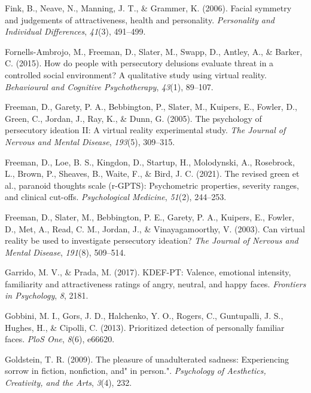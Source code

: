 \documentclass[
  man,floatsintext]{apa6}
\newlength{\cslhangindent}
\newlength{\cslentryspacingunit} %
\newenvironment{CSLReferences}[2] %
 {%
  \setlength{\parindent}{0pt}
  \ifodd #1
  \let\oldpar\par
  \def\par{\hangindent=\cslhangindent\oldpar}
  \fi
  \setlength{\parskip}{#2\cslentryspacingunit}
 }%
 {}
\begin{document}
\begin{CSLReferences}{1}{0}
\leavevmode{}%
Fink, B., Neave, N., Manning, J. T., \& Grammer, K. (2006). Facial symmetry and judgements of attractiveness, health and personality. \emph{Personality and Individual Differences}, \emph{41}(3), 491--499.

\leavevmode{}%
Fornells-Ambrojo, M., Freeman, D., Slater, M., Swapp, D., Antley, A., \& Barker, C. (2015). How do people with persecutory delusions evaluate threat in a controlled social environment? A qualitative study using virtual reality. \emph{Behavioural and Cognitive Psychotherapy}, \emph{43}(1), 89--107.

\leavevmode{}%
Freeman, D., Garety, P. A., Bebbington, P., Slater, M., Kuipers, E., Fowler, D., Green, C., Jordan, J., Ray, K., \& Dunn, G. (2005). The psychology of persecutory ideation II: A virtual reality experimental study. \emph{The Journal of Nervous and Mental Disease}, \emph{193}(5), 309--315.

\leavevmode{}%
Freeman, D., Loe, B. S., Kingdon, D., Startup, H., Molodynski, A., Rosebrock, L., Brown, P., Sheaves, B., Waite, F., \& Bird, J. C. (2021). The revised green et al., paranoid thoughts scale (r-GPTS): Psychometric properties, severity ranges, and clinical cut-offs. \emph{Psychological Medicine}, \emph{51}(2), 244--253.

\leavevmode{}%
Freeman, D., Slater, M., Bebbington, P. E., Garety, P. A., Kuipers, E., Fowler, D., Met, A., Read, C. M., Jordan, J., \& Vinayagamoorthy, V. (2003). Can virtual reality be used to investigate persecutory ideation? \emph{The Journal of Nervous and Mental Disease}, \emph{191}(8), 509--514.

\leavevmode{}%
Garrido, M. V., \& Prada, M. (2017). KDEF-PT: Valence, emotional intensity, familiarity and attractiveness ratings of angry, neutral, and happy faces. \emph{Frontiers in Psychology}, \emph{8}, 2181.

\leavevmode{}%
Gobbini, M. I., Gors, J. D., Halchenko, Y. O., Rogers, C., Guntupalli, J. S., Hughes, H., \& Cipolli, C. (2013). Prioritized detection of personally familiar faces. \emph{PloS One}, \emph{8}(6), e66620.

\leavevmode{}%
Goldstein, T. R. (2009). The pleasure of unadulterated sadness: Experiencing sorrow in fiction, nonfiction, and" in person.". \emph{Psychology of Aesthetics, Creativity, and the Arts}, \emph{3}(4), 232.


\end{CSLReferences}
\end{document}
